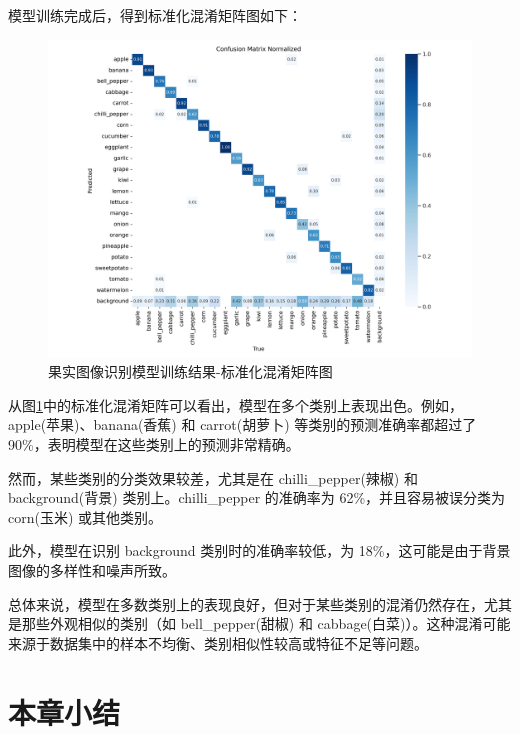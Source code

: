 模型训练完成后，得到标准化混淆矩阵图如下：

\begin{figure}[H]
    \centering
    \includegraphics[width=0.8\linewidth]{../source/aws-img/yolov8/out/image/confusion_matrix_normalized.png}
    \caption{果实图像识别模型训练结果-标准化混淆矩阵图}
    \label{fig:confusion_matrix_normalized}
\end{figure}

从图\ref{fig:confusion_matrix_normalized}中的标准化混淆矩阵可以看出，模型在多个类别上表现出色。例如，apple(苹果)、banana(香蕉) 和 carrot(胡萝卜) 等类别的预测准确率都超过了 90\%，表明模型在这些类别上的预测非常精确。

然而，某些类别的分类效果较差，尤其是在 chilli\_pepper(辣椒) 和 background(背景) 类别上。chilli\_pepper 的准确率为 62\%，并且容易被误分类为 corn(玉米) 或其他类别。

此外，模型在识别 background 类别时的准确率较低，为 18\%，这可能是由于背景图像的多样性和噪声所致。

总体来说，模型在多数类别上的表现良好，但对于某些类别的混淆仍然存在，尤其是那些外观相似的类别（如 bell\_pepper(甜椒) 和 cabbage(白菜)）。这种混淆可能来源于数据集中的样本不均衡、类别相似性较高或特征不足等问题。

\section{本章小结}